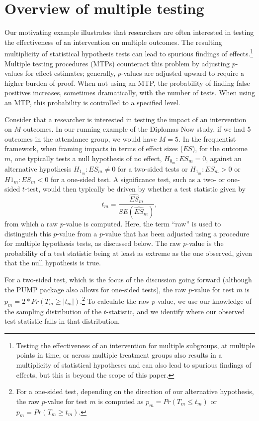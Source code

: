 \documentclass[
]{article}
\begin{document}
\section{Overview of multiple testing}
\label{sec:mtp_overview}

Our motivating example illustrates that researchers are often interested
in testing the effectiveness of an intervention on multiple outcomes.
The resulting multiplicity of statistical hypothesis tests can lead to
spurious findings of
effects.\footnote{Testing the effectiveness of an intervention for multiple subgroups, at multiple points in time, or across multiple treatment groups also results in a multiplicity of statistical hypotheses and can also lead to spurious findings of effects, but this is beyond the scope of this paper.}
Multiple testing procedures (MTPs) counteract this problem by adjusting
\(p\)-values for effect estimates; generally, \(p\)-values are adjusted
upward to require a higher burden of proof. When not using an MTP, the
probability of finding false positives increases, sometimes
dramatically, with the number of tests. When using an MTP, this
probability is controlled to a specified level.

Consider that a researcher is interested in testing the impact of an
intervention on \(M\) outcomes. In our running example of the Diplomas
Now study, if we had 5 outcomes in the attendance group, we would have
\(M = 5\). In the frequentist framework, when framing impacts in terms
of effect sizes (\(ES\)), for the outcome \(m\), one typically tests a
null hypothesis of no effect, \(H_{0_m}: ES_m = 0\), against an
alternative hypothesis \(H_{1_m}: ES_m \neq 0\) for a two-sided tests or
\(H_{1_m}: ES_m > 0\) or \(H1_m: ES_m < 0\) for a one-sided test. A
significance test, such as a two- or one-sided \(t\)-test, would then
typically be driven by whether a test statistic given by
\begin{equation}
t_m = \frac{\hat{ES}_m}{SE(\hat{ES}_m)},
\end{equation} from which a raw \(p\)-value is computed. Here, the term
``raw'' is used to distinguish this \(p\)-value from a \(p\)-value that
has been adjusted using a procedure for multiple hypothesis tests, as
discussed below. The raw \(p\)-value is the probability of a test
statistic being at least as extreme as the one observed, given that the
null hypothesis is true.

For a two-sided test, which is the focus of the discussion going forward
(although the PUMP package also allows for one-sided tests), the raw
\(p\)-value for test \(m\) is
\(p_m=2*Pr(T_m \geq |t_m|)\).\footnote{For a one-sided test, depending on the direction of our alternative hypothesis, the raw $p$-value for test $m$ is computed as $p_m=Pr(T_m \leq t_m)$ or $p_m=Pr(T_m \geq t_m)$.}
To calculate the raw \(p\)-value, we use our knowledge of the sampling
distribution of the \(t\)-statistic, and we identify where our observed
test statistic falls in that distribution.
\end{document}

